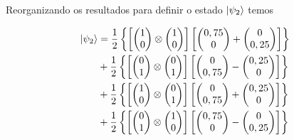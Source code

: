 Reorganizando os resultados para definir o estado $\ket{\psi_2}$ temos

\begin{equation}
 \begin{split}
\ket{\psi_2} &=\frac{1}{2} \left\{ \left[\begin{pmatrix}
1 \\
0
\end{pmatrix} \otimes \begin{pmatrix}
1 \\
0
\end{pmatrix}\right] \left[ \begin{pmatrix}
0,75 \\
0
\end{pmatrix} +  \begin{pmatrix}
0 \\
0,25
\end{pmatrix}\right]\right\} \nonumber \\
&+\frac{1}{2} \left\{ \left[\begin{pmatrix}
0 \\
1
\end{pmatrix} \otimes \begin{pmatrix}
0 \\
1
\end{pmatrix}\right] \left[ \begin{pmatrix}
0 \\
0,75
\end{pmatrix} -  \begin{pmatrix}
0,25 \\
0
\end{pmatrix}\right]\right\} \nonumber \\
&+\frac{1}{2} \left\{\left[ \begin{pmatrix}
1 \\
0
\end{pmatrix} \otimes \begin{pmatrix}
0 \\
1
\end{pmatrix}\right] \left[ \begin{pmatrix}
0 \\
0,75
\end{pmatrix} +  \begin{pmatrix}
0,25 \\
0
\end{pmatrix}\right]\right\} \nonumber \\
&+\frac{1}{2} \left\{ \left[ \begin{pmatrix}
0 \\
1
\end{pmatrix} \otimes \begin{pmatrix}
1 \\
0
\end{pmatrix}\right] \left[ \begin{pmatrix}
0,75 \\
0
\end{pmatrix} -  \begin{pmatrix}
0 \\
0,25
\end{pmatrix}\right] \right\}
  \end{split}
\end{equation}	
	

